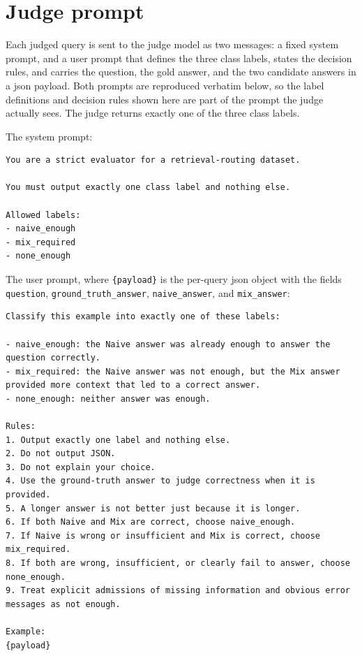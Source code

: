 \documentclass[english, bibtex]{kththesis}               %
\numberwithin{listing}{chapter}
\begin{document}
\section{Judge prompt}
\label{app:judgePrompt}

Each judged query is sent to the judge model as two messages: a fixed system prompt, and a user prompt that defines the three class labels, states the decision rules, and carries the question, the gold answer, and the two candidate answers in a \gls{json} payload. Both prompts are reproduced verbatim below, so the label definitions and decision rules shown here are part of the prompt the judge actually sees. The judge returns exactly one of the three class labels.

The system prompt:

\begin{lstlisting}[basicstyle=\ttfamily\small,breaklines=true,columns=fullflexible]
You are a strict evaluator for a retrieval-routing dataset.

You must output exactly one class label and nothing else.

Allowed labels:
- naive_enough
- mix_required
- none_enough
\end{lstlisting}

The user prompt, where \texttt{\{payload\}} is the per-query \gls{json} object with the fields \texttt{question}, \texttt{ground\_truth\_answer}, \texttt{naive\_answer}, and \texttt{mix\_answer}:

\begin{lstlisting}[basicstyle=\ttfamily\small,breaklines=true,columns=fullflexible]
Classify this example into exactly one of these labels:

- naive_enough: the Naive answer was already enough to answer the question correctly.
- mix_required: the Naive answer was not enough, but the Mix answer provided more context that led to a correct answer.
- none_enough: neither answer was enough.

Rules:
1. Output exactly one label and nothing else.
2. Do not output JSON.
3. Do not explain your choice.
4. Use the ground-truth answer to judge correctness when it is provided.
5. A longer answer is not better just because it is longer.
6. If both Naive and Mix are correct, choose naive_enough.
7. If Naive is wrong or insufficient and Mix is correct, choose mix_required.
8. If both are wrong, insufficient, or clearly fail to answer, choose none_enough.
9. Treat explicit admissions of missing information and obvious error messages as not enough.

Example:
{payload}
\end{lstlisting}
\end{document}
